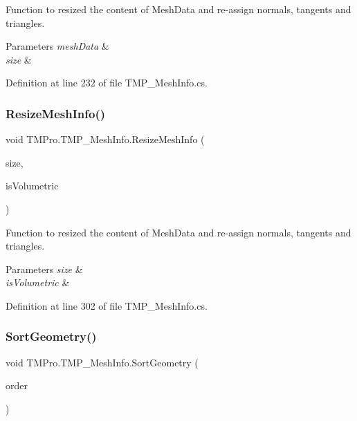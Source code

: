 Function to resized the content of Mesh\+Data and re-\/assign normals, tangents and triangles. 


\begin{DoxyParams}{Parameters}
{\em mesh\+Data} & \\
\hline
{\em size} & \\
\hline
\end{DoxyParams}


Definition at line 232 of file T\+M\+P\+\_\+\+Mesh\+Info.\+cs.

\mbox{\label{struct_t_m_pro_1_1_t_m_p___mesh_info_a4948f8abff302bcc8b6ea6cfc2f0af3d}} 
\subsubsection{\texorpdfstring{ResizeMeshInfo()}{ResizeMeshInfo()}\hspace{0.1cm}{\footnotesize\ttfamily [2/2]}}
{\footnotesize\ttfamily void T\+M\+Pro.\+T\+M\+P\+\_\+\+Mesh\+Info.\+Resize\+Mesh\+Info (\begin{DoxyParamCaption}\item[{int}]{size,  }\item[{bool}]{is\+Volumetric }\end{DoxyParamCaption})}



Function to resized the content of Mesh\+Data and re-\/assign normals, tangents and triangles. 


\begin{DoxyParams}{Parameters}
{\em size} & \\
\hline
{\em is\+Volumetric} & \\
\hline
\end{DoxyParams}


Definition at line 302 of file T\+M\+P\+\_\+\+Mesh\+Info.\+cs.

\mbox{\label{struct_t_m_pro_1_1_t_m_p___mesh_info_a2514314a12727c88ad96da1fc2dcbfab}} 
\subsubsection{\texorpdfstring{SortGeometry()}{SortGeometry()}\hspace{0.1cm}{\footnotesize\ttfamily [1/2]}}
{\footnotesize\ttfamily void T\+M\+Pro.\+T\+M\+P\+\_\+\+Mesh\+Info.\+Sort\+Geometry (\begin{DoxyParamCaption}\item[{\mbox{\hyperlink{namespace_t_m_pro_a29c2b2e41c29850d1bc0760ac64b1ee0}{Vertex\+Sorting\+Order}}}]{order }\end{DoxyParamCaption})}



